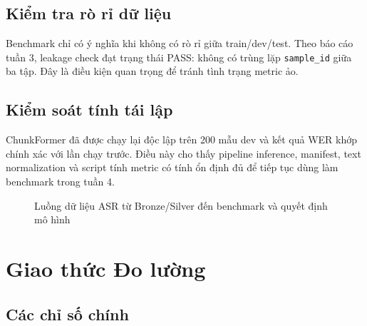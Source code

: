 \documentclass[12pt,a4paper]{article}
\begin{document}
\subsection{Kiểm tra rò rỉ dữ liệu}

Benchmark chỉ có ý nghĩa khi không có rò rỉ giữa train/dev/test. Theo báo cáo tuần 3, leakage check đạt trạng thái PASS: không có trùng lặp \texttt{sample\_id} giữa ba tập. Đây là điều kiện quan trọng để tránh tình trạng metric ảo.

\subsection{Kiểm soát tính tái lập}

ChunkFormer đã được chạy lại độc lập trên 200 mẫu dev và kết quả WER khớp chính xác với lần chạy trước. Điều này cho thấy pipeline inference, manifest, text normalization và script tính metric có tính ổn định đủ để tiếp tục dùng làm benchmark trong tuần 4.

\begin{figure}[h]
\centering
{}
\caption{Luồng dữ liệu ASR từ Bronze/Silver đến benchmark và quyết định mô hình}
\end{figure}

\section{Giao thức Đo lường}

\subsection{Các chỉ số chính}
\end{document}

